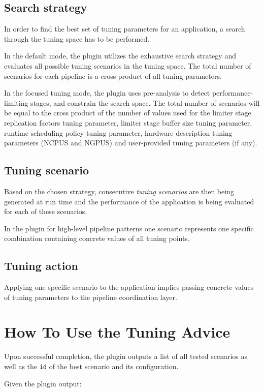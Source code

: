 \documentclass[11pt,a4paper, oneside]{book} %
\begin{document}
\section{Search strategy}
In order to find the best set of tuning parameters for an application, a search through the tuning space has to be performed.

In the default mode, the plugin utilizes the exhaustive search strategy and evaluates all possible tuning scenarios in the tuning space. The total number of scenarios for each pipeline is a cross product of all tuning parameters.

In the focused tuning mode, the plugin uses pre-analysis to detect performance-limiting stages, and constrain the search space. The total number of scenarios will be equal to the cross product of the number of values used for the limiter stage replication factors tuning parameter, limiter stage buffer size tuning parameter, runtime scheduling policy tuning parameter, hardware description tuning parameters (NCPUS and NGPUS) and user-provided tuning parameters (if any).


\section{Tuning scenario}
Based on the chosen strategy, consecutive \textit{tuning scenarios} are then being generated at run time and the performance of the application is being evaluated for each of these scenarios.

In the plugin for high-level pipeline patterns one scenario represents one specific combination containing concrete values of all tuning points.

\section{Tuning action}
Applying one specific scenario to the application implies passing concrete values of tuning parameters to the pipeline coordination layer.

\chapter{How To Use the Tuning Advice}
Upon successful completion, the plugin outputs a list of all tested scenarios as well as the \texttt{id} of the best scenario and its configuration.

Given the plugin output:
\end{document}
